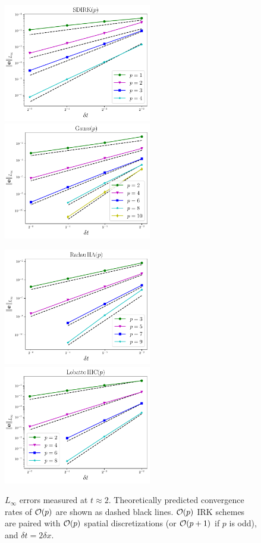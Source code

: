 \documentclass[review]{siamart}
\begin{document}
\begin{figure}[H]
\centerline{
\includegraphics[width = 0.575\textwidth]{figures/SDIRK_d2_ex1}
\quad
\includegraphics[width = 0.575\textwidth]{figures/Gauss_d2_ex1}
}
\centerline{
\includegraphics[width = 0.575\textwidth]{figures/RadauIIA_d2_ex1}
\quad
\includegraphics[width = 0.575\textwidth]{figures/LobattoIIIC_d2_ex1}
}
\caption{$L_{\infty}$ errors measured at $t \approx 2$. Theoretically predicted convergence rates of ${\cal O}(p)$ are shown as dashed black lines. ${\cal O}(p)$ IRK schemes are paired with ${\cal O}(p)$ spatial discretizations (or ${\cal O}(p+1)$ if $p$ is odd), and $\delta t = 2 \delta x$. 
\label{fig:errors2D}
}
\end{figure}
\end{document}
